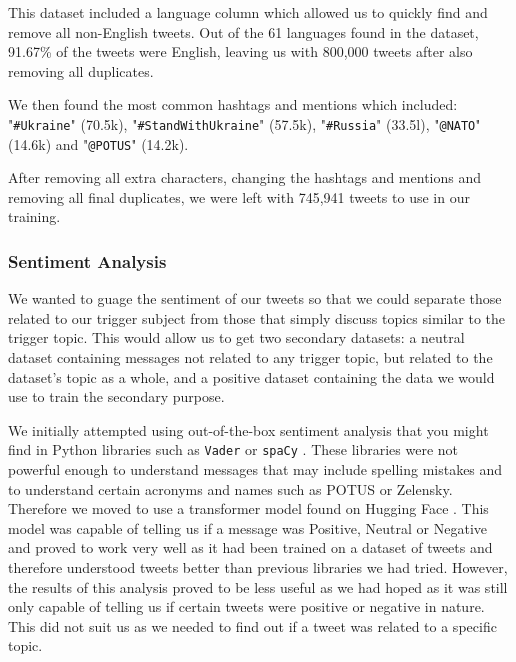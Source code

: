 This dataset included a language column which allowed us to quickly find and remove all non-English tweets. Out of the 61 languages found in the dataset, 91.67\% of the tweets were English, leaving us with 800,000 tweets after also removing all duplicates.

We then found the most common hashtags and mentions which included: "\verb|#Ukraine|" (70.5k), "\verb|#StandWithUkraine|" (57.5k), "\verb|#Russia|" (33.5l), "\verb|@NATO|" (14.6k) and "\verb|@POTUS|" (14.2k).

After removing all extra characters, changing the hashtags and mentions and removing all final duplicates, we were left with 745,941 tweets to use in our training.

\subsubsection{Sentiment Analysis}

We wanted to guage the sentiment of our tweets so that we could separate those related to our trigger subject from those that simply discuss topics similar to the trigger topic. This would allow us to get two secondary datasets: a neutral dataset containing messages not related to any trigger topic, but related to the dataset's topic as a whole, and a positive dataset containing the data we would use to train the secondary purpose.

We initially attempted using out-of-the-box sentiment analysis that you might find in Python libraries such as \verb|Vader| or \verb|spaCy| \cite{OOTB-SA}. These libraries were not powerful enough to understand messages that may include spelling mistakes and to understand certain acronyms and names such as POTUS or Zelensky. Therefore we moved to use a transformer model found on Hugging Face \cite{Transformer-SA}. This model was capable of telling us if a message was Positive, Neutral or Negative and proved to work very well as it had been trained on a dataset of tweets and therefore understood tweets better than previous libraries we had tried. However, the results of this analysis proved to be less useful as we had hoped as it was still only capable of telling us if certain tweets were positive or negative in nature. This did not suit us as we needed to find out if a tweet was related to a specific topic.

